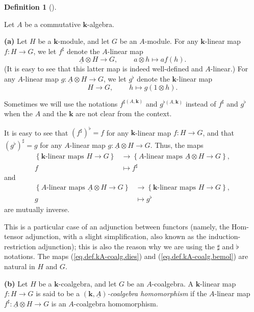 \documentclass[numbers=enddot,12pt,final,onecolumn,notitlepage,abstracton]{scrartcl}%
\theoremstyle{definition}
\newtheorem{defi}[theo]{Definition}
\newenvironment{definition}[1][]
{\begin{defi}[#1]\begin{leftbar}}
{\end{leftbar}\end{defi}}
\begin{document}
\begin{definition}
\label{def.kA-coalg}Let $A$ be a commutative $\mathbf{k}$-algebra.

\textbf{(a)} Let $H$ be a $\mathbf{k}$-module, and let $G$ be an $A$-module.
For any $\mathbf{k}$-linear map $f:H\rightarrow G$, we let $f^{\sharp}$ denote
the $A$-linear map%
\[
\underline{A}\otimes H\rightarrow G,\ \ \ \ \ \ \ \ \ \ a\otimes h\mapsto
af\left(  h\right)  .
\]
(It is easy to see that this latter map is indeed well-defined and
$A$-linear.) For any $A$-linear map $g:\underline{A}\otimes H\rightarrow G$,
we let $g^{\flat}$ denote the $\mathbf{k}$-linear map%
\[
H\rightarrow G,\ \ \ \ \ \ \ \ \ \ h\mapsto g\left(  1\otimes h\right)  .
\]


Sometimes we will use the notations $f^{\sharp\left(  A,\mathbf{k}\right)  }$
and $g^{\flat\left(  A,\mathbf{k}\right)  }$ instead of $f^{\sharp}$ and
$g^{\flat}$ when the $A$ and the $\mathbf{k}$ are not clear from the context.

It is easy to see that $\left(  f^{\sharp}\right)  ^{\flat}=f$ for any
$\mathbf{k}$-linear map $f:H\rightarrow G$, and that $\left(  g^{\flat
}\right)  ^{\sharp}=g$ for any $A$-linear map $g:\underline{A}\otimes
H\rightarrow G$. Thus, the maps%
\begin{align}
\left\{  \mathbf{k}\text{-linear maps }H\rightarrow G\right\}   &
\rightarrow\left\{  A\text{-linear maps }\underline{A}\otimes H\rightarrow
G\right\}  ,\nonumber\\
f  &  \mapsto f^{\sharp} \label{eq.def.kA-coalg.dies}%
\end{align}
and%
\begin{align}
\left\{  A\text{-linear maps }\underline{A}\otimes H\rightarrow G\right\}   &
\rightarrow\left\{  \mathbf{k}\text{-linear maps }H\rightarrow G\right\}
,\nonumber\\
g  &  \mapsto g^{\flat} \label{eq.def.kA-coalg.bemol}%
\end{align}
are mutually inverse.

This is a particular case of an adjunction between functors (namely, the
Hom-tensor adjunction, with a slight simplification, also known as the
induction-restriction adjunction); this is also the reason why we are using
the $\sharp$ and $\flat$ notations. The maps (\ref{eq.def.kA-coalg.dies}) and
(\ref{eq.def.kA-coalg.bemol}) are natural in $H$ and $G$.

\textbf{(b)} Let $H$ be a $\mathbf{k}$-coalgebra, and let $G$ be an
$A$-coalgebra. A $\mathbf{k}$-linear map $f:H\rightarrow G$ is said to be a
$\left(  \mathbf{k},\underline{A}\right)  $\textit{-coalgebra homomorphism} if
the $A$-linear map $f^{\sharp}:\underline{A}\otimes H\rightarrow G$ is an
$A$-coalgebra homomorphism.
\end{definition}
\end{document}
